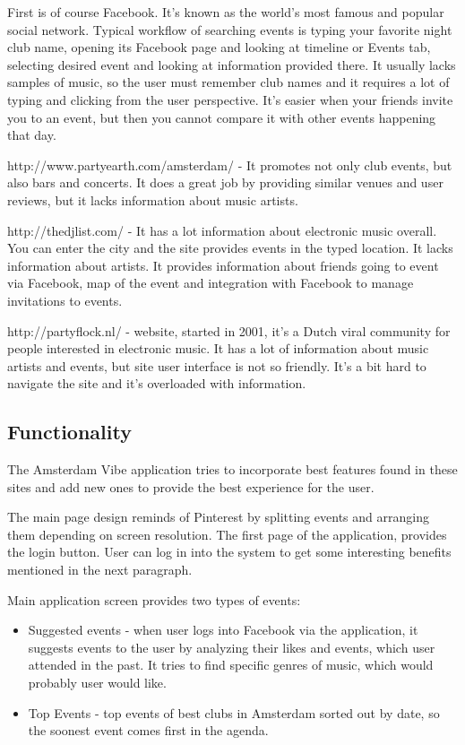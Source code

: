 \documentclass[12pt, a4paper, lithuanian]{article}
\begin{document}
  First is of course Facebook. It's known as the world's most famous and popular social network. Typical workflow of searching events is typing your favorite night club name, opening its Facebook page and looking at timeline or Events tab, selecting desired event and looking at information provided there. It usually lacks samples of music, so the user must remember club names and it requires a lot of typing and clicking from the user perspective. It's easier when your friends invite you to an event, but then you cannot compare it with other events happening that day.

  http://www.partyearth.com/amsterdam/ - It promotes not only club events, but also bars and concerts. It does a great job by providing similar venues and user reviews, but it lacks information about music artists.

  http://thedjlist.com/ - It has a lot information about electronic music overall. You can enter the city and the site provides events in the typed location. It lacks information about artists. It provides information about friends going to event via Facebook, map of the event and integration with Facebook to manage invitations to events. 

  http://partyflock.nl/ - website, started in 2001, it's a Dutch viral community for people interested in electronic music. It has a lot of information about music artists and events, but site user interface is not so friendly. It's a bit hard to navigate the site and it's overloaded with information.

\subsection{Functionality}

  The Amsterdam Vibe application tries to incorporate best features found in these sites and add new ones to provide the best experience for the user.

  The main page design reminds of Pinterest by splitting events and arranging them depending on screen resolution. The first page of the application, provides the login button. User can log in into the system to get some interesting benefits mentioned in the next paragraph.

  Main application screen provides two types of events:

\begin{itemize}

  \item Suggested events - when user logs into Facebook via the application, it suggests events to the user by analyzing their likes and events, which user attended in the past. It tries to find specific genres of music, which would probably user would like.

  \item Top Events - top events of best clubs in Amsterdam sorted out by date, so the soonest event comes first in the agenda.

\end{itemize}
\end{document}
